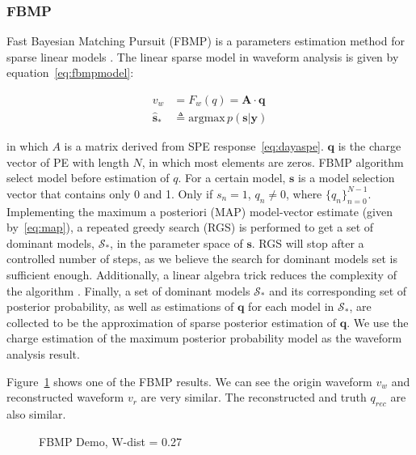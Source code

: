 \subsubsection{FBMP}

Fast Bayesian Matching Pursuit (FBMP) is a parameters estimation method for sparse linear models \cite{schniter_fast_nodate}. The linear sparse model in waveform analysis is given by equation~\eqref{eq:fbmpmodel}: 

\begin{align}
    v_{w} &= F_{w}(q) = \boldsymbol{A}\cdot \boldsymbol{q} \label{eq:fbmpmodel} \\
    \hat{\boldsymbol{s}}_{*} &\triangleq \mathrm{argmax}\,p(\boldsymbol{s}|\boldsymbol{y}) \label{eq:map}
\end{align}

in which $A$ is a matrix derived from SPE response~\eqref{eq:dayaspe}. $\boldsymbol{q}$ is the charge vector of PE with length $N$, in which most elements are zeros. FBMP algorithm select model before estimation of $q$. For a certain model, $\boldsymbol{s}$ is a model selection vector that contains only 0 and 1. Only if $s_{n}=1$, $q_{n}\neq0$, where $\{q_{n}\}_{n=0}^{N-1}$. Implementing the maximum a posteriori (MAP) model-vector estimate (given by~\eqref{eq:map}), a repeated greedy search (RGS) is performed to get a set of dominant models, $\mathcal{S}_{*}$, in the parameter space of $\boldsymbol{s}$. RGS will stop after a controlled number of steps, as we believe the search for dominant models set is sufficient enough. Additionally, a linear algebra trick reduces the complexity of the algorithm \cite{schniter_fast_nodate}. Finally, a set of dominant models $\mathcal{S}_{*}$ and its corresponding set of posterior probability, as well as estimations of $\boldsymbol{q}$ for each model in $\mathcal{S}_{*}$, are collected to be the approximation of sparse posterior estimation of $\boldsymbol{q}$. We use the charge estimation of the maximum posterior probability model as the waveform analysis result. 

Figure~\ref{fig:fbmp} shows one of the FBMP results. We can see the origin waveform $v_{w}$ and reconstructed waveform $v_{r}$ are very similar. The reconstructed and truth $q_{rec}$ are also similar. 

\begin{figure}[H]
    \centering
    \scalebox{0.45}{}
    \caption{\label{fig:fbmp} FBMP Demo, W-dist = 0.27}
\end{figure}

